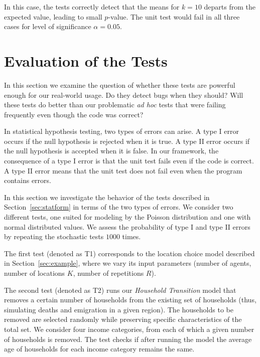 \documentclass{sig-alternate-preprint}
\begin{document}
In this case, the tests correctly detect that the means for $k=10$ departs from
the expected value, leading to small $p$-value.  The unit test would fail
in all three cases for level of significance $\alpha=0.05$.


\section{Evaluation of the Tests}
\label{sec:power}
%
In this section we examine the question of
whether these tests are powerful enough for our 
real-world usage.  Do they detect bugs when they should?  Will these tests do 
better than our problematic \emph{ad hoc} tests that were failing frequently 
even though the code was correct?

In statistical hypothesis testing, two types of errors can arise.  A type I
error occurs if the null hypothesis is rejected when it is true. A type II
error occurs if the null hypothesis is accepted when it is false. 
In our framework, the
consequence of a type I error is that the unit test fails
even if the code is correct. A type II error means that the unit test does
not fail even when the program contains errors. 

In this section we investigate the behavior of the tests described in
Section~\ref{sec:statform} in terms of the two types of errors. We consider
two different tests, one suited for modeling by the Poisson distribution and
one with normal distributed values.  We assess the probability of type I and
type II errors by repeating the stochastic tests $1000$ times.

The first test (denoted as T1) corresponds to the location choice
model described in Section~\ref{sec:example}, where we vary its input
parameters (number of agents, number of locations $K$, number of repetitions
$R$).

The second test (denoted as T2) runs our \emph{Household Transition} model that removes a
certain number of households from the existing set of households (thus,
simulating deaths and emigration in a given region). The households to be
removed are selected randomly while preserving specific characteristics of the
total set. We consider four income categories, from each of which a given
number of households is removed. The test checks if after running the model
the average age of households for each income category remains the same.
\end{document}
